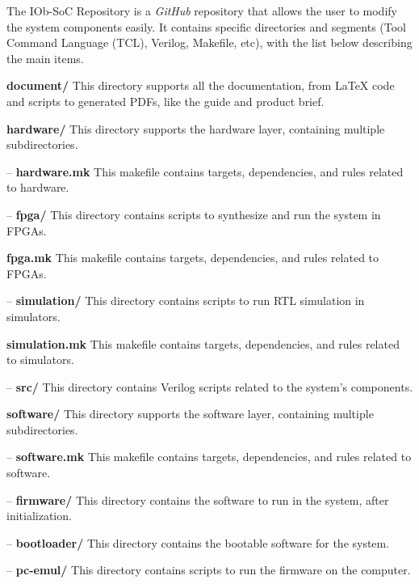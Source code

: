 The IOb-SoC Repository is a \textit{GitHub} repository that allows the user to modify the system components easily. It contains specific directories and segments (Tool Command Language (TCL), Verilog, Makefile, etc), with the list below describing the main items.

\textbf{document/} This directory supports all the documentation, from LaTeX code and scripts to generated PDFs, like the guide and product brief.

\textbf{hardware/} This directory supports the hardware layer, containing multiple subdirectories.

\hspace{0.5cm} – \textbf{hardware.mk} This makefile contains targets, dependencies, and rules related to hardware.

\hspace{0.5cm} – \textbf{fpga/} This directory contains scripts to synthesize and run the system in FPGAs.

\hspace{1.2cm}\textbf{fpga.mk} This makefile contains targets, dependencies, and rules related to FPGAs.

\hspace{0.5cm} – \textbf{simulation/} This directory contains scripts to run RTL simulation in simulators.

\hspace{1.2cm}\textbf{simulation.mk} This makefile contains targets, dependencies, and rules related to simulators.

\hspace{0.5cm}– \textbf{src/} This directory contains Verilog scripts related to the system’s components.

\textbf{software/} This directory supports the software layer, containing multiple subdirectories.

\hspace{0.5cm}– \textbf{software.mk} This makefile contains targets, dependencies, and rules related to software.

\hspace{0.5cm}– \textbf{firmware/} This directory contains the software to run in the system, after initialization.

\hspace{0.5cm}– \textbf{bootloader/} This directory contains the bootable software for the system.

\hspace{0.5cm}– \textbf{pc-emul/} This directory contains scripts to run the firmware on the computer.

